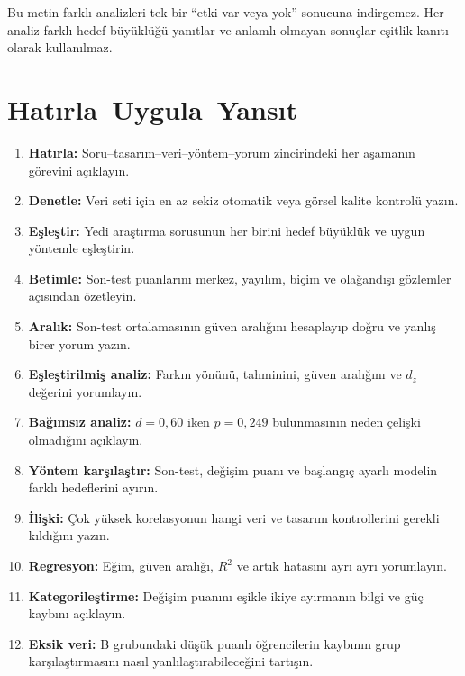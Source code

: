 Bu metin farklı analizleri tek bir ``etki var veya yok'' sonucuna indirgemez.
Her analiz farklı hedef büyüklüğü yanıtlar ve anlamlı olmayan sonuçlar eşitlik
kanıtı olarak kullanılmaz.





\section*{Hatırla--Uygula--Yansıt}

\begin{enumerate}
\renewcommand{\labelenumi}{\textbf{\Alph{enumi}.}}
  \item \textbf{Hatırla:} Soru--tasarım--veri--yöntem--yorum zincirindeki her aşamanın görevini açıklayın.
  \item \textbf{Denetle:} Veri seti için en az sekiz otomatik veya görsel kalite kontrolü yazın.
  \item \textbf{Eşleştir:} Yedi araştırma sorusunun her birini hedef büyüklük ve uygun yöntemle eşleştirin.
  \item \textbf{Betimle:} Son-test puanlarını merkez, yayılım, biçim ve olağandışı gözlemler açısından özetleyin.
  \item \textbf{Aralık:} Son-test ortalamasının güven aralığını hesaplayıp doğru ve yanlış birer yorum yazın.
  \item \textbf{Eşleştirilmiş analiz:} Farkın yönünü, tahminini, güven aralığını ve $d_z$ değerini yorumlayın.
  \item \textbf{Bağımsız analiz:} $d=0{,}60$ iken $p=0{,}249$ bulunmasının neden çelişki olmadığını açıklayın.
  \item \textbf{Yöntem karşılaştır:} Son-test, değişim puanı ve başlangıç ayarlı modelin farklı hedeflerini ayırın.
  \item \textbf{İlişki:} Çok yüksek korelasyonun hangi veri ve tasarım kontrollerini gerekli kıldığını yazın.
  \item \textbf{Regresyon:} Eğim, güven aralığı, $R^2$ ve artık hatasını ayrı ayrı yorumlayın.
  \item \textbf{Kategorileştirme:} Değişim puanını eşikle ikiye ayırmanın bilgi ve güç kaybını açıklayın.
  \item \textbf{Eksik veri:} B grubundaki düşük puanlı öğrencilerin kaybının grup karşılaştırmasını nasıl yanlılaştırabileceğini tartışın.

\end{enumerate}
